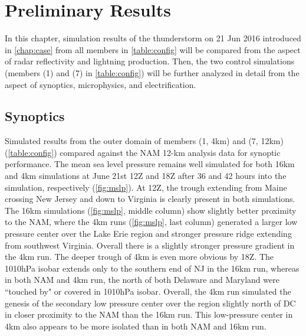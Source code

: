  
\chapter{Preliminary Results}
\label{chap:results}
\resetfootnote %
In this chapter, simulation results of the thunderstorm on 21 Jun 2016 introduced in \ref{chap:case} from all members in \ref{table:config} will be compared from the aspect of radar reflectivity and lightning production. Then, the two control simulations (members (1) and (7) in \ref{table:config}) will be further analyzed in detail from the aspect of synoptics, microphysics, and electrification.
\section{Synoptics}
Simulated results from the outer domain of members (1, 4km) and (7, 12km) (\ref{table:config}) compared against the NAM 12-km analysis data for synoptic performance. The mean sea level pressure remains well simulated for both 16km and 4km simulations at June 21st 12Z and 18Z after 36 and 42 hours into the simulation, respectively (\ref{fig:mslp}). At 12Z, the trough extending from Maine crossing New Jersey and down to Virginia is clearly present in both simulations. The 16km simulations (\ref{fig:mslp}, middle column) show slightly better proximity to the NAM, where the 4km runs (\ref{fig:mslp}, last column) generated a larger low pressure center over the Lake Erie region and stronger pressure ridge extending from southwest Virginia. Overall there is a slightly stronger pressure gradient in the 4km run. The deeper trough of 4km is even more obvious by 18Z. The 1010hPa isobar extends only to the southern end of NJ in the 16km run, whereas in both NAM and 4km run, the north of both Delaware and Maryland were ``touched by" or covered in 1010hPa isobar. Overall, the 4km run simulated the genesis of the secondary low pressure center over the region slightly north of DC in closer proximity to the NAM than the 16km run. This low-pressure center in 4km also appears to be more isolated than in both NAM and 16km run. 

